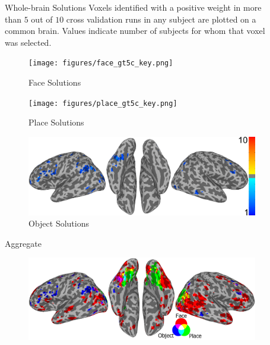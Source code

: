 \documentclass[final]{beamer}
\newlength{\sepwid}
\newlength{\introcolwid}
\begin{document}
\begin{frame}[t]
\begin{columns}[t]
\begin{column}{\introcolwid}
   	\end{column}

    \begin{column}{\sepwid}\end{column}			%
    \begin{column}{\introcolwid}					  %
		
		\begin{block}{Whole-brain Solutions}
			Voxels identified with a positive weight in more than $5$ out of $10$ cross validation runs in any subject are plotted on a common brain. Values indicate number of subjects for whom that voxel was selected.
			\begin{figure}
				\texttt{[image: figures/face\_gt5c\_key.png]}
				\caption{Face Solutions}
			\end{figure}
			\begin{figure}
				\texttt{[image: figures/place\_gt5c\_key.png]}
				\caption{Place Solutions}
			\end{figure}
			\begin{figure}
				\includegraphics[width=\textwidth]{figures/object_gt5c_key.png}
				\caption{Object Solutions}
			\end{figure}
		\end{block}
          \begin{block}{Aggregate}
			\begin{figure}
				\includegraphics[width=\textwidth]{figures/FPO_gt5b2.png}

\end{figure}
\end{block}
\end{column}
\end{columns}
\end{frame}
\end{document}
